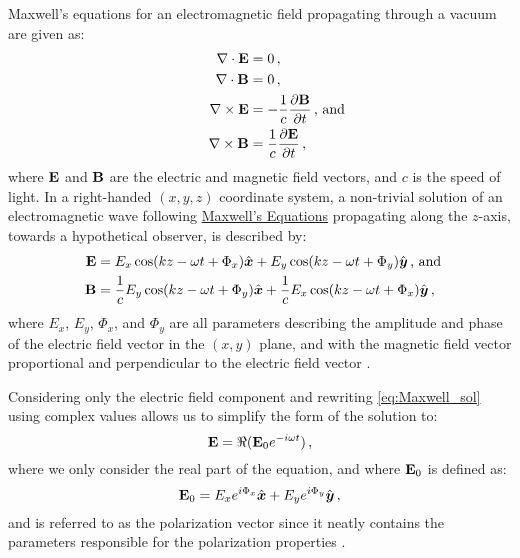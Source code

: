 Maxwell's equations for an electromagnetic field propagating through a vacuum are given as:
\begin{equation} \label{eq:Maxwell}
    \begin{aligned}
        \nabla \cdot \matr{E} &= 0 \,,\\
        \nabla \cdot \matr{B} &= 0 \,,\\
        \nabla \times \matr{E} &= - \frac{1}{c} \frac{\partial \matr{B}}{\partial t} \rlap{\,,\ and}\\
        \nabla \times \matr{B} &= \frac{1}{c} \frac{\partial \matr{E}}{\partial t}\,,
    \end{aligned}
\end{equation}
where $\mathbf{E}$ and $\mathbf{B}$ are the electric and magnetic field vectors, and $c$ is the speed of light. In a right-handed $(x, y, z)$ coordinate system, a non-trivial solution of an electromagnetic wave following \hyperref[eq:Maxwell]{Maxwell's Equations} propagating along the $z$-axis, towards a hypothetical observer, is described by:
\begin{equation} \label{eq:Maxwell_sol}
    \begin{aligned}
        \matr{E} &= E_{x} \cos(kz - \omega t + \Phi_{x}) \hat{\boldsymbol{x}} +
        E_{y} \cos(kz - \omega t + \Phi_{y}) \hat{\boldsymbol{y}} \rlap{\,,\ and}\\
        \matr{B} &= \frac{1}{c} E_{y} \cos(kz - \omega t + \Phi_{y}) \hat{\boldsymbol{x}} +
        \frac{1}{c} E_{x} \cos(kz - \omega t + \Phi_{x}) \hat{\boldsymbol{y}}\,,
    \end{aligned}
\end{equation}
where $E_{x}$, $E_{y}$, $\Phi_{x}$, and $\Phi_{y}$ are all parameters describing the amplitude and phase of the electric field vector in the $(x, y)$ plane, and with the magnetic field vector proportional and perpendicular to the electric field vector \citep{Griffiths}.

Considering only the electric field component and rewriting \autoref{eq:Maxwell_sol} using complex values allows us to simplify the form of the solution to:
\begin{equation} \label{eq:E_field_vector}
    \mathbf{E} = \Re(\mathbf{E}_{0} e^{-i \omega t})\,,
\end{equation}
where we only consider the real part of the equation, and where $\mathbf{E}_{0}$ is defined as:
\begin{equation} \label{eq:pol_vector}
    \mathbf{E}_{0} = E_{x} e^{i \Phi_{x}} \hat{\boldsymbol{x}} +
    E_{y} e^{i \Phi_{y}} \hat{\boldsymbol{y}}\,,
\end{equation}
and is referred to as the polarization vector since it neatly contains the parameters responsible for the polarization properties \citep{pol_phys}.

